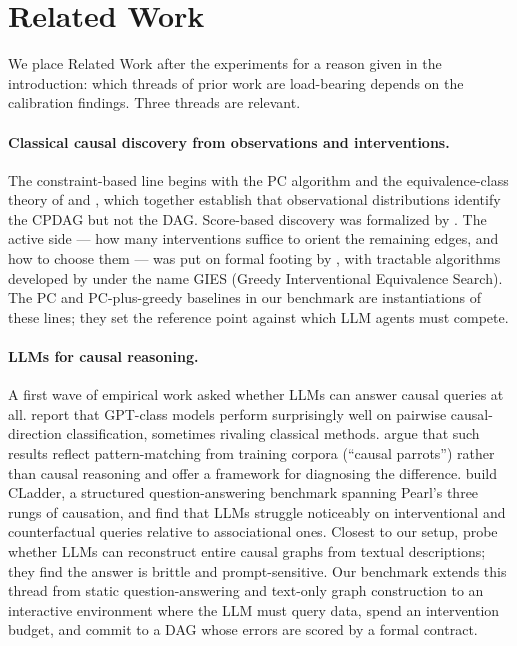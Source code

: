 \section{Related Work}
\label{sec:related}

We place Related Work after the experiments for a reason given in the introduction: which threads of prior work are load-bearing depends on the calibration findings. Three threads are relevant.

\paragraph{Classical causal discovery from observations and interventions.} The constraint-based line begins with the PC algorithm \citep{spirtes2000causation} and the equivalence-class theory of \citet{verma1990equivalence} and \citet{andersson1997characterization}, which together establish that observational distributions identify the CPDAG but not the DAG. Score-based discovery was formalized by \citet{chickering2002ges}. The active side --- how many interventions suffice to orient the remaining edges, and how to choose them --- was put on formal footing by \citet{eberhardt2005interventions}, with tractable algorithms developed by \citet{hauser2012gies} under the name GIES (Greedy Interventional Equivalence Search). The PC and PC-plus-greedy baselines in our benchmark are instantiations of these lines; they set the reference point against which LLM agents must compete.

\paragraph{LLMs for causal reasoning.} A first wave of empirical work asked whether LLMs can answer causal queries at all. \citet{kiciman2023llmcausal} report that GPT-class models perform surprisingly well on pairwise causal-direction classification, sometimes rivaling classical methods. \citet{zecevic2023causalparrots} argue that such results reflect pattern-matching from training corpora (``causal parrots'') rather than causal reasoning and offer a framework for diagnosing the difference. \citet{jin2023cladder} build CLadder, a structured question-answering benchmark spanning Pearl's three rungs of causation, and find that LLMs struggle noticeably on interventional and counterfactual queries relative to associational ones. Closest to our setup, \citet{long2023llmgraphs} probe whether LLMs can reconstruct entire causal graphs from textual descriptions; they find the answer is brittle and prompt-sensitive. Our benchmark extends this thread from static question-answering and text-only graph construction to an interactive environment where the LLM must query data, spend an intervention budget, and commit to a DAG whose errors are scored by a formal contract.

